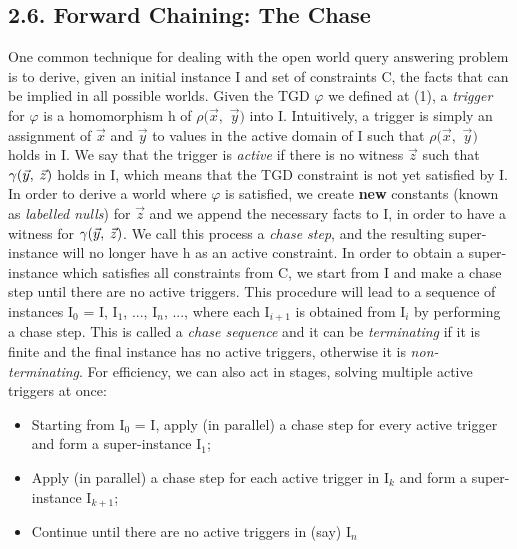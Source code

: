 \documentclass[11pt, a4paper, dvipsnames]{article}
\begin{document}
\subsection{2.6. Forward Chaining: The Chase}
One common technique for dealing with the open world query answering problem is to derive, given an initial instance I and set of constraints C, the facts that can be implied in all possible worlds.\newline
Given the TGD $\varphi$ we defined at (1), a \textit{trigger} for $\varphi$ is a  homomorphism h of $\rho(\vec{x},$ $\vec{y})$ into I. Intuitively, a trigger is simply an assignment of $\vec{x}$ and $\vec{y}$ to values in the active domain of I such that $\rho(\vec{x},$ $\vec{y})$ holds in I. We say that the trigger is \textit{active} if there is no witness $\vec{z}$ such that $\gamma(\vec{y}, \hspace{0.25em}\vec{z})$ holds in I, which means that the TGD constraint is not yet satisfied by I.\newline
In order to derive a world where $\varphi$ is satisfied, we create \textbf{new} constants (known as \textit{labelled nulls}) for $\vec{z}$ and we append the necessary facts to I, in order to have a witness for $\gamma(\vec{y}, \hspace{0.25em}\vec{z})$. We call this process a \textit{chase step}, and the resulting super-instance will no longer have h as an active constraint. In order to obtain a super-instance which satisfies all constraints from C, we start from I and make a chase step until there are no active triggers. This procedure will lead to a sequence of instances I$_{0}$ = I, I$_{1}$, ..., I$_{n}$, ..., where each I$_{i+1}$ is obtained from I$_{i}$ by performing a chase step. This is called a \textit{chase sequence} and it can be \textit{terminating} if it is finite and the final instance has no active triggers, otherwise it is \textit{non-terminating}.\newline
For efficiency, we can also act in stages, solving multiple active triggers at once:
\begin{itemize}
	\item Starting from I$_{0}$ = I, apply (in parallel) a chase step for every active trigger and form a super-instance I$_{1}$;
	\item Apply (in parallel) a chase step for each active trigger in I$_{k}$ and form a super-instance I$_{k+1}$;
	\item Continue until there are no active triggers in (say) I$_{n}$
\end{itemize}
\end{document}
